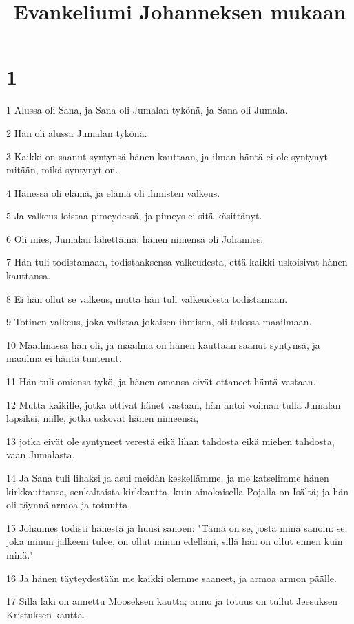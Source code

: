 

\title{Evankeliumi Johanneksen mukaan}


\chapter{1}

\par 1 Alussa oli Sana, ja Sana oli Jumalan tykönä, ja Sana oli Jumala.
\par 2 Hän oli alussa Jumalan tykönä.
\par 3 Kaikki on saanut syntynsä hänen kauttaan, ja ilman häntä ei ole syntynyt mitään, mikä syntynyt on.
\par 4 Hänessä oli elämä, ja elämä oli ihmisten valkeus.
\par 5 Ja valkeus loistaa pimeydessä, ja pimeys ei sitä käsittänyt.
\par 6 Oli mies, Jumalan lähettämä; hänen nimensä oli Johannes.
\par 7 Hän tuli todistamaan, todistaaksensa valkeudesta, että kaikki uskoisivat hänen kauttansa.
\par 8 Ei hän ollut se valkeus, mutta hän tuli valkeudesta todistamaan.
\par 9 Totinen valkeus, joka valistaa jokaisen ihmisen, oli tulossa maailmaan.
\par 10 Maailmassa hän oli, ja maailma on hänen kauttaan saanut syntynsä, ja maailma ei häntä tuntenut.
\par 11 Hän tuli omiensa tykö, ja hänen omansa eivät ottaneet häntä vastaan.
\par 12 Mutta kaikille, jotka ottivat hänet vastaan, hän antoi voiman tulla Jumalan lapsiksi, niille, jotka uskovat hänen nimeensä,
\par 13 jotka eivät ole syntyneet verestä eikä lihan tahdosta eikä miehen tahdosta, vaan Jumalasta.
\par 14 Ja Sana tuli lihaksi ja asui meidän keskellämme, ja me katselimme hänen kirkkauttansa, senkaltaista kirkkautta, kuin ainokaisella Pojalla on Isältä; ja hän oli täynnä armoa ja totuutta.
\par 15 Johannes todisti hänestä ja huusi sanoen: "Tämä on se, josta minä sanoin: se, joka minun jälkeeni tulee, on ollut minun edelläni, sillä hän on ollut ennen kuin minä."
\par 16 Ja hänen täyteydestään me kaikki olemme saaneet, ja armoa armon päälle.
\par 17 Sillä laki on annettu Mooseksen kautta; armo ja totuus on tullut Jeesuksen Kristuksen kautta.
